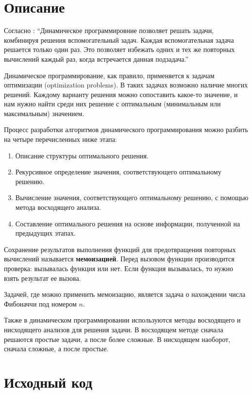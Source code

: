 \section{Описание}

Согласно \cite{Kormen}: \enquote{Динамическое программировние позволяет решать задачи, комбинируя решения 
вспомогательный задач. Каждая вспомогательная задача решается только
один раз. Это позволяет избежать одних и тех же повторных вычислений каждый раз, 
когда встречается данная подзадача.}

Динамическое программирование, как правило, применяется к задачам оптимизации (optimization problems). 
В таких задачах возможно наличие многих решений. Каждому варианту решения можно сопоставить какое-то значение, 
и нам нужно найти среди них решение с оптимальным (минимальным или максимальным) значением.

Процесс разработки алгоритмов динамического программирования можно разбить на четыре перечисленных ниже этапа:

\begin{enumerate}
    \item Описание структуры оптимального решения.
    \item Рекурсивное определение значения, соответствующего оптимальному решению.
    \item Вычисление значения, соответствующего оптимальному решению, с помощью метода восходящего анализа.
    \item Составление оптимального решения на основе информации, полученной на предыдущих этапах.
\end{enumerate}


Сохранение результатов выполнения функций для предотвращения повторных вычислений называется \textbf{мемоизацией}.
Перед вызовом функции производится проверка: вызывалась функция или нет. Если функция вызывалась, 
то нужно взять результат ее вызова.

Задачей, где можно применить мемоизацию, является задача о нахождении числа Фибоначчи под номером $n$.

Также в динамическом программировании используются методы восходящего и нисходящего анализов для решения задачи.
В восходящем методе сначала решаются простые задачи, а после более сложные. В нисходящем наоборот, сначала сложные, а
после простые. 


\pagebreak

\section{Исходный код}


